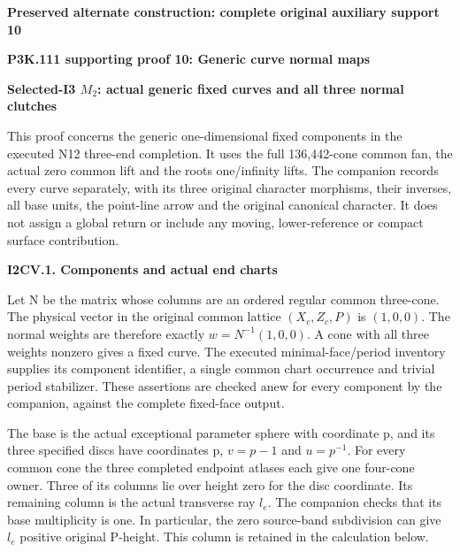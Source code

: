 



\par\bigskip\noindent\textbf{Preserved alternate construction: complete original auxiliary support 10}\par
\par\bigskip\noindent\textbf{P3K.111 supporting proof 10: Generic curve normal maps}\par\nobreak
\par

\medskip\noindent\textbf{Selected-I3 \(M_{2}\): actual generic fixed curves and all three normal clutches}

\par\nobreak

This proof concerns the generic one-dimensional fixed components in the
executed N12 three-end completion. It uses the full 136,442-cone common
fan, the actual zero common lift and the root\textquotesingle s one/infinity lifts. The
companion records every curve separately, with its three original
character morphisms, their inverses, all base units, the point-line
arrow and the original canonical character. It does not assign a
global return or include any moving, lower-reference or compact
surface contribution.

\par

\medskip\noindent\textbf{I2CV.1. Components and actual end charts}

\par\nobreak

Let N be the matrix whose columns are an ordered regular common
three-cone. The physical vector in the original common lattice
\((X_c,Z_c,P)\) is \((1,0,0)\). The normal weights are therefore exactly
\(w=N^{-1}(1,0,0)\). A cone with all three weights nonzero gives a fixed
curve. The executed minimal-face/period inventory supplies its
component identifier, a single common chart occurrence and trivial
period stabilizer. These assertions are checked anew for every
component by the companion, against the complete fixed-face output.

The base is the actual exceptional parameter sphere with coordinate p,
and its three specified discs have coordinates p, \(v=p-1\) and \(u=p^{-1}\).
For every common cone the three completed endpoint atlases each give
one four-cone owner. Three of its columns lie over height zero for the
disc coordinate. Its remaining column is the actual transverse ray \(l_e\).
The companion checks that its base multiplicity is one. In particular,
the zero source-band subdivision can give \(l_e\) positive original
P-height. This column is retained in the calculation below.

